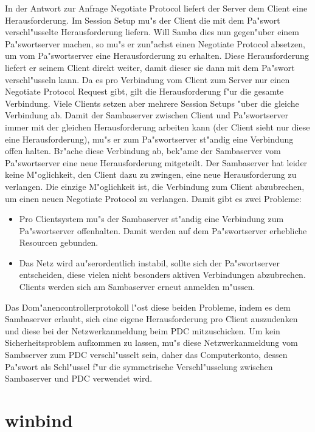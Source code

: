 \documentclass{scrartcl}\usepackage{pslatex}\typearea{12}
\begin{document}
In der Antwort zur Anfrage Negotiate Protocol liefert der Server dem
Client eine Herausforderung. Im Session Setup mu"s der Client die mit
dem Pa"swort verschl"usselte Herausforderung liefern. Will Samba dies
nun gegen"uber einem Pa"swortserver machen, so mu"s er zun"achst einen
Negotiate Protocol absetzen, um vom Pa"swortserver eine
Herausforderung zu erhalten. Diese Herausforderung liefert er seinem
Client direkt weiter, damit dieser sie dann mit dem Pa"swort
verschl"usseln kann. Da es pro Verbindung vom Client zum Server nur
einen Negotiate Protocol Request gibt, gilt die Herausforderung f"ur
die gesamte Verbindung.  Viele Clients setzen aber mehrere Session
Setups "uber die gleiche Verbindung ab. Damit der Sambaserver zwischen
Client und Pa"swortserver immer mit der gleichen Herausforderung
arbeiten kann (der Client sieht nur diese eine Herausforderung), mu"s
er zum Pa"swortserver st"andig eine Verbindung offen halten. Br"ache
diese Verbindung ab, bek"ame der Sambaserver vom Pa"swortserver eine
neue Herausforderung mitgeteilt. Der Sambaserver hat leider keine
M"oglichkeit, den Client dazu zu zwingen, eine neue Herausforderung zu
verlangen. Die einzige M"oglichkeit ist, die Verbindung zum Client
abzubrechen, um einen neuen Negotiate Protocol zu verlangen. Damit
gibt es zwei Probleme:

\begin{itemize}
\item Pro Clientsystem mu"s der Sambaserver st"andig eine Verbindung
zum Pa"swortserver offenhalten. Damit werden auf dem Pa"swortserver
erhebliche Resourcen gebunden.
\item Das Netz wird au"serordentlich instabil, sollte sich der
Pa"swortserver entscheiden, diese vielen nicht besonders aktiven
Verbindungen abzubrechen. Clients werden sich am Sambaserver
erneut anmelden m"ussen.
\end{itemize}

Das Dom"anencontrollerprotokoll l"ost diese beiden Probleme, indem es
dem Sambaserver erlaubt, sich eine eigene Herausforderung pro Client
auszudenken und diese bei der Netzwerkanmeldung beim PDC
mitzuschicken.  Um kein Sicherheitsproblem aufkommen zu lassen, mu"s
diese Netzwerkanmeldung vom Sambserver zum PDC verschl"usselt sein,
daher das Computerkonto, dessen Pa"swort als Schl"ussel f"ur die
symmetrische Verschl"usselung zwischen Sambaserver und PDC verwendet
wird.

\section{winbind}
\end{document}
